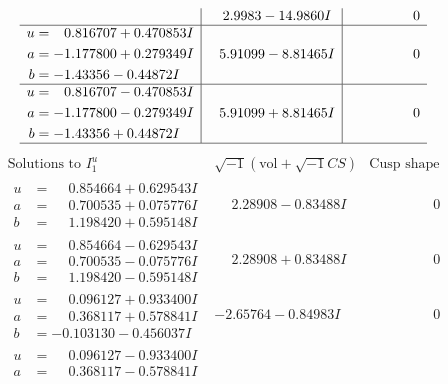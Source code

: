 \documentclass[1p]{elsarticle_modified}
\theoremstyle{definition}
\newcommand{\I}{\sqrt{-1}}
\begin{document}
$$\begin{array}{c|c|c}
 & \phantom{-}2.9983 - 14.9860 I & \phantom{-0.000000 } 0 \\ \hline\begin{aligned}
u &= \phantom{-}0.816707 + 0.470853 I \\
a &= -1.177800 + 0.279349 I \\
b &= -1.43356 - 0.44872 I\end{aligned}
 & \phantom{-}5.91099 - 8.81465 I & \phantom{-0.000000 } 0 \\ \hline\begin{aligned}
u &= \phantom{-}0.816707 - 0.470853 I \\
a &= -1.177800 - 0.279349 I \\
b &= -1.43356 + 0.44872 I\end{aligned}
 & \phantom{-}5.91099 + 8.81465 I & \phantom{-0.000000 } 0\\
 \hline 
 \end{array}$$\newpage$$\begin{array}{c|c|c}  
\text{Solutions to }I^u_{1}& \I (\text{vol} + \sqrt{-1}CS) & \text{Cusp shape}\\
 \hline 
\begin{aligned}
u &= \phantom{-}0.854664 + 0.629543 I \\
a &= \phantom{-}0.700535 + 0.075776 I \\
b &= \phantom{-}1.198420 + 0.595148 I\end{aligned}
 & \phantom{-}2.28908 - 0.83488 I & \phantom{-0.000000 } 0 \\ \hline\begin{aligned}
u &= \phantom{-}0.854664 - 0.629543 I \\
a &= \phantom{-}0.700535 - 0.075776 I \\
b &= \phantom{-}1.198420 - 0.595148 I\end{aligned}
 & \phantom{-}2.28908 + 0.83488 I & \phantom{-0.000000 } 0 \\ \hline\begin{aligned}
u &= \phantom{-}0.096127 + 0.933400 I \\
a &= \phantom{-}0.368117 + 0.578841 I \\
b &= -0.103130 - 0.456037 I\end{aligned}
 & -2.65764 - 0.84983 I & \phantom{-0.000000 } 0 \\ \hline\begin{aligned}
u &= \phantom{-}0.096127 - 0.933400 I \\
a &= \phantom{-}0.368117 - 0.578841 I \\

\end{aligned}
\end{array}$$
\end{document}
